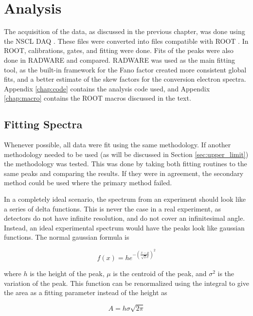 \chapter{Analysis}
\label{ch:analysis}

The acquisition of the data, as discussed in the previous chapter, was done using the NSCL DAQ \citep{nscl:_daq, prokop14:_nsclddas}. These files were converted into files compatible with ROOT \citep{brun97:_root}. In ROOT, calibrations, gates, and fitting were done. Fits of the peaks were also done in RADWARE \citep{radford00:_radware} and compared. RADWARE was used as the main fitting tool, as the built-in framework for the Fano factor \citep{fano47:_factor} created more consistent global fits, and a better estimate of the skew factors for the conversion electron spectra. Appendix \ref{chap:code} contains the analysis code used, and Appendix \ref{chap:macro} contains the ROOT macros discussed in the text.

\section{Fitting Spectra}
\label{sec:fitting}

Whenever possible, all data were fit using the same methodology. If another methodology needed to be used (as will be discussed in Section \ref{sec:upper_limit}) the methodology was tested. This was done by taking both fitting routines to the same peaks and comparing the results. If they were in agreement, the secondary method could be used where the primary method failed.

In a completely ideal scenario, the spectrum from an experiment should look like a series of delta functions. This is never the case in a real experiment, as detectors do not have infinite resolution, and do not cover an infinitesimal angle. Instead, an ideal experimental spectrum would have the peaks look like gaussian functions. The normal gaussian formula is 

\begin{equation}
    f(x) = he^{-\left(\frac{x-\mu}{\sqrt{2}\sigma}\right)^2}
    \label{eq:gaus}
\end{equation}

where $h$ is the height of the peak, $\mu$ is the centroid of the peak, and $\sigma^2$ is the variation of the peak. This function can be renormalized using the integral to give the area as a fitting parameter instead of the height as 

\begin{equation}
    A = h\sigma\sqrt{2\pi}
\end{equation}

